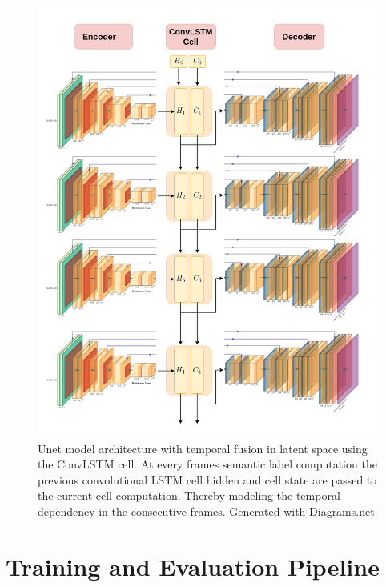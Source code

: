 	\begin{figure}
		\centering
		\includegraphics[width=14cm]{images/unet_lstm.png}
		\caption{Unet model architecture with temporal fusion in latent space using the ConvLSTM cell. At every frames semantic label computation the previous convolutional LSTM cell hidden and cell state are passed to the current cell computation. Thereby modeling the temporal dependency in the consecutive frames. Generated with \href{https://app.diagrams.net/}{Diagrams.net}}
		\label{fig:unet_lstm}
	\end{figure}     
        
    \section{Training and Evaluation Pipeline}
    
